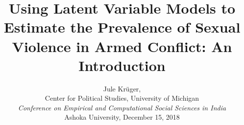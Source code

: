 \documentclass[xcolor=dvipsnames,12pt]{beamer} %
\title{Using Latent Variable Models to Estimate the Prevalence of Sexual Violence in Armed Conflict: An Introduction}
\author{Jule Kr\"{u}ger, \\ Center for Political Studies, University of Michigan\\[.5cm]
\emph{Conference on Empirical and Computational Social Sciences in India}\\[.5cm] Ashoka University, December 15, 2018}
\date{}
\begin{document}
\frame{\titlepage}
\end{document}
